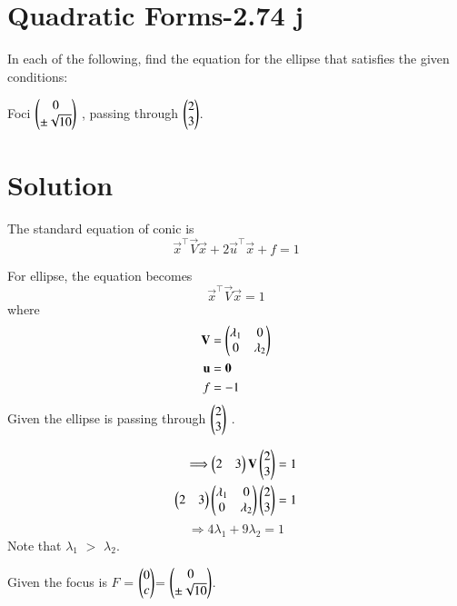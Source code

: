 \documentclass[journal,12pt,twocolumn]{IEEEtran}
\begin{document}
\section{Quadratic Forms-2.74 j}
In each of the following, find the equation for
the ellipse that satisfies the given conditions:

Foci $\begin{pmatrix}0 \\ \pm \sqrt{10}\end{pmatrix}$ , passing through $\begin{pmatrix}2\\3\end{pmatrix}$.

\section{Solution}
The standard equation of conic is
\begin{equation}
    \vec{x}^{\top}\vec{V}\vec{x}+2\vec{u}^{\top}\vec{x}+f = 1
\end{equation}

For ellipse, the equation becomes
\begin{equation}
    \vec{x}^{\top}\vec{V}\vec{x} = 1
\end{equation}
where
\begin{align}
    \mathbf{V} &= \begin{pmatrix}\lambda_1 & 0 \\ 0 & \lambda_2\end{pmatrix}\\
    \mathbf{u} &= \mathbf{0}\\
    f &= -1
\end{align}
Given the ellipse is passing through $\begin{pmatrix}2\\3\end{pmatrix}$ .

\begin{align}
   \Longrightarrow  \begin{pmatrix}2&3\end{pmatrix}\mathbf{V} \begin{pmatrix}2\\3\end{pmatrix}& = 1\\
     \begin{pmatrix}2&3\end{pmatrix}\begin{pmatrix}\lambda_1&0\\0&\lambda_2\end{pmatrix} \begin{pmatrix}2\\3\end{pmatrix}& = 1
\end{align}
\begin{equation}
     \Longrightarrow 4\lambda_1 +9\lambda_2=1 \label{eq:5}
\end{equation}
Note that $\lambda_1$ $>$ $\lambda_2$.

Given the focus is $F$ = $\begin{pmatrix}0 \\ c\end{pmatrix}$= $\begin{pmatrix}0 \\ \pm \sqrt{10}\end{pmatrix}$.
\end{document}
